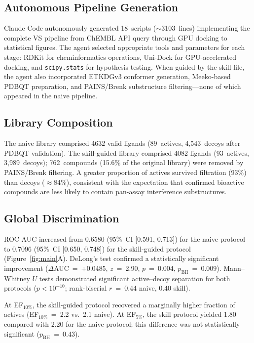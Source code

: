 \documentclass[10pt,a4paper,twocolumn]{article}
\newcommand{\NNAIVE}{4632}
\newcommand{\NSKILL}{4082}
\newcommand{\PAINSFILT}{762}
\newcommand{\NSCRIPTS}{18}
\newcommand{\NLINES}{3103}
\begin{document}
\subsection*{Autonomous Pipeline Generation}

Claude Code autonomously generated \NSCRIPTS{}~scripts ($\sim$\NLINES{}~lines) implementing the complete VS pipeline from ChEMBL API query through GPU docking to statistical figures. The agent selected appropriate tools and parameters for each stage: RDKit for cheminformatics operations, Uni-Dock for GPU-accelerated docking, and \texttt{scipy.stats} for hypothesis testing. When guided by the skill file, the agent also incorporated ETKDGv3 conformer generation, Meeko-based PDBQT preparation, and PAINS/Brenk substructure filtering---none of which appeared in the naive pipeline.

\subsection*{Library Composition}

The naive library comprised \NNAIVE{} valid ligands (89~actives, 4,543~decoys after PDBQT validation). The skill-guided library comprised \NSKILL{} ligands (93~actives, 3,989~decoys); \PAINSFILT{}~compounds (15.6\% of the original library) were removed by PAINS/Brenk filtering. A greater proportion of actives survived filtration (93\%) than decoys ($\approx$84\%), consistent with the expectation that confirmed bioactive compounds are less likely to contain pan-assay interference substructures.

\subsection*{Global Discrimination}

ROC AUC increased from 0.6580 (95\%~CI [0.591, 0.713]) for the naive protocol to 0.7096 (95\%~CI [0.650, 0.748]) for the skill-guided protocol (Figure~\ref{fig:main}A). DeLong's test confirmed a statistically significant improvement ($\Delta$AUC~=~+0.0485, $z$~=~2.90, $p$~=~0.004, $p_{\mathrm{BH}}$~=~0.009). Mann--Whitney $U$ tests demonstrated significant active--decoy separation for both protocols ($p < 10^{-10}$; rank-biserial $r$~=~0.44 naive, 0.40 skill).

At EF$_{10\%}$, the skill-guided protocol recovered a marginally higher fraction of actives (EF$_{10\%}$~=~2.2 vs.\ 2.1 naive). At EF$_{5\%}$, the skill protocol yielded 1.80 compared with 2.20 for the naive protocol; this difference was not statistically significant ($p_{\mathrm{BH}}$~=~0.43).
\end{document}
